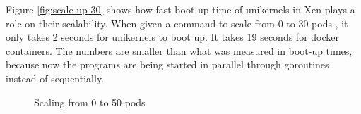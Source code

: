 Figure \ref{fig:scale-up-30} shows how fast boot-up time of unikernels in Xen plays a role on their scalability. When given a command to scale from 0 to 30 pods , it only takes 2 seconds for unikernels to boot up. It takes 19 seconds for docker containers. The numbers are smaller than what was measured in boot-up times, because now the programs are being started in parallel through goroutines instead of sequentially.


\begin{figure}[htpb]
  \centering
  \caption{Scaling from 0 to 50 pods}\label{fig:scale-up-50}
  \end{figure}

